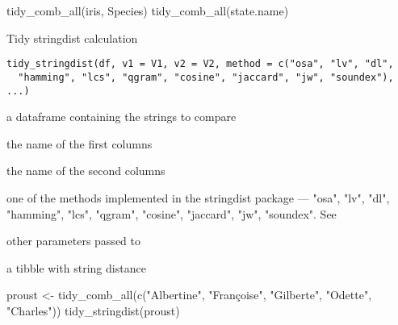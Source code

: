 \documentclass[a4paper]{book}
\begin{document}
%
\begin{Examples}
\begin{ExampleCode}
tidy_comb_all(iris, Species)
tidy_comb_all(state.name)

\end{ExampleCode}
\end{Examples}
%
\begin{Description}\relax
Tidy stringdist calculation
\end{Description}
%
\begin{Usage}
\begin{verbatim}
tidy_stringdist(df, v1 = V1, v2 = V2, method = c("osa", "lv", "dl",
  "hamming", "lcs", "qgram", "cosine", "jaccard", "jw", "soundex"), ...)
\end{verbatim}
\end{Usage}
%
\begin{Arguments}
\begin{ldescription}
\item[\code{df}] a dataframe containing the strings to compare

\item[\code{v1}] the name of the first columns

\item[\code{v2}] the name of the second columns

\item[\code{method}] one of the methods implemented in the stringdist package — "osa", "lv", "dl", "hamming", "lcs", "qgram", "cosine", "jaccard", "jw", "soundex". See 

\item[\code{...}] other parameters passed to 
\end{ldescription}
\end{Arguments}
%
\begin{Value}
a tibble with string distance
\end{Value}
%
\begin{Examples}
\begin{ExampleCode}
proust <- tidy_comb_all(c("Albertine", "Françoise", "Gilberte", "Odette", "Charles"))
tidy_stringdist(proust)
\end{ExampleCode}
\end{Examples}
\printindex{}
\end{document}

